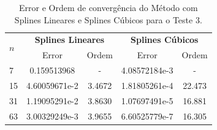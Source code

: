 \documentclass[12pt,a4paper]{report}
\begin{document}
\begin{table}[H]
\caption{\label{tabla4} Error e Ordem de convergência do Método com Splines Lineares e Splines Cúbicos para o Teste 3.}
\centering
  \begin{tabular}{l|cc|cc}
    \hline
    \hline
    \multirow{2}{*}{\textbf{$n$}} &
      \multicolumn{2}{c}{\textbf{Splines Lineares}} &\multicolumn{2}{c}{\textbf{Splines Cúbicos}} \\
    &\multicolumn{1}{c|}{Error} & \multicolumn{1}{c|}{Ordem} & \multicolumn{1}{c|}{Error} & \multicolumn{1}{c}{Ordem}\\
    \hline
    \hline
	7   & 0.159513968 & - & 4.08572184e-3  & - \\
	15 & 4.60059671e-2 & 3.4672 & 1.81805261e-4 & 22.473\\
	31 & 1.19095291e-2 & 3.8630 & 1.07697491e-5 & 16.881\\
	63 & 3.00329249e-3 & 3.9655 & 6.60525779e-7 & 16.305\\
    \hline
    \hline
  \end{tabular}
\end{table}


\end{document}
